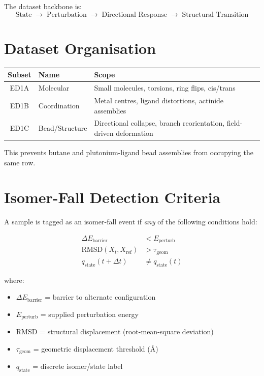 \documentclass[11pt]{article}
\begin{document}
The dataset backbone is:
\begin{equation}
\boxed{\text{State} \;\to\; \text{Perturbation} \;\to\; \text{Directional Response} \;\to\; \text{Structural Transition}}
\end{equation}

\section{Dataset Organisation}

\begin{center}
\begin{tabular}{clp{8cm}}
\toprule
\textbf{Subset} & \textbf{Name} & \textbf{Scope} \\
\midrule
ED1A & Molecular & Small molecules, torsions, ring flips, cis/trans \\
ED1B & Coordination & Metal centres, ligand distortions, actinide assemblies \\
ED1C & Bead/Structure & Directional collapse, branch reorientation, field-driven deformation \\
\bottomrule
\end{tabular}
\end{center}

This prevents butane and plutonium-ligand bead assemblies from occupying the same row.

\section{Isomer-Fall Detection Criteria}

A sample is tagged as an isomer-fall event if \textit{any} of the following
conditions hold:

\begin{align}
\Delta E_{\text{barrier}} &< E_{\text{perturb}} \label{eq:barrier} \\
\text{RMSD}(X_t, X_{\text{ref}}) &> \tau_{\text{geom}} \label{eq:rmsd} \\
q_{\text{state}}(t + \Delta t) &\neq q_{\text{state}}(t) \label{eq:label}
\end{align}

where:
\begin{itemize}
  \item $\Delta E_{\text{barrier}}$ = barrier to alternate configuration
  \item $E_{\text{perturb}}$ = supplied perturbation energy
  \item $\text{RMSD}$ = structural displacement (root-mean-square deviation)
  \item $\tau_{\text{geom}}$ = geometric displacement threshold (\AA)
  \item $q_{\text{state}}$ = discrete isomer/state label
\end{itemize}
\end{document}
